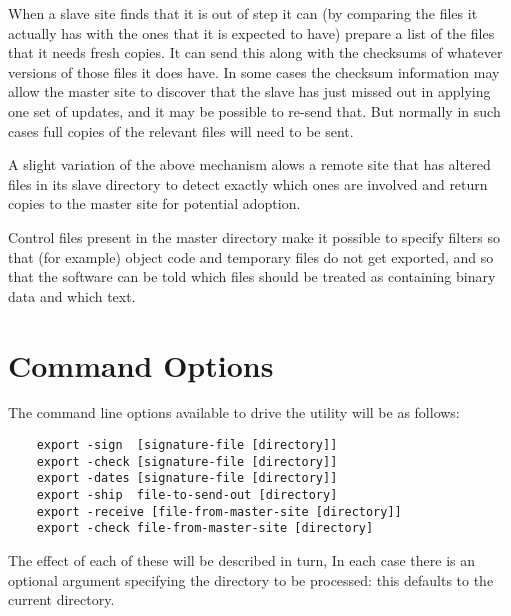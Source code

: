 When a slave site finds that it is out of step it can (by comparing the
files it actually has with the ones that it is expected to have)
prepare a list of the files that it needs fresh copies. It can send this
along with the checksums of whatever versions of those files it does
have.  In some cases the checksum information may allow the master site
to discover that the slave has just missed out in applying one
set of updates, and it may be possible to re-send that. But normally
in such cases full copies of the relevant files will need to be sent.

A slight variation of the above mechanism alows a remote site that
has altered files in its slave directory to detect exactly which ones are
involved and return copies to the master site for potential adoption.

Control files present in the master directory make it possible to specify
filters so that (for example) object code and temporary files do not
get exported, and so that the software can be told which files should
be treated as containing binary data and which text.

\section{Command Options}
The command line options available to drive the utility will be
as follows:
\begin{verbatim}
    export -sign  [signature-file [directory]]
    export -check [signature-file [directory]]
    export -dates [signature-file [directory]]
    export -ship  file-to-send-out [directory]
    export -receive [file-from-master-site [directory]]
    export -check file-from-master-site [directory]
\end{verbatim}
\noindent The effect of each of these will be described in turn,  In each
case there is an optional argument specifying the directory to be processed:
this defaults to the current directory.

